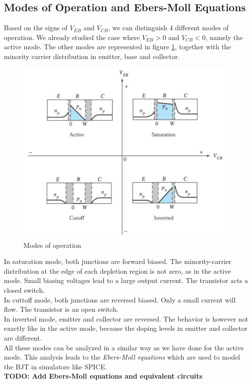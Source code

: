 \subsection{Modes of Operation and Ebers-Moll Equations}
\label{sec:modes_of_operation}
Based on the signs of $V_{EB}$ and $V_{CB}$, we can distinguish $4$ different modes of operation. We already studied the case where $V_{EB} > 0$ and $V_{CB} < 0$, namely the active mode. The other modes are represented in figure \ref{fig:bjt_modes}, together with the minority carrier distribution in emitter, base and collector.
\begin{figure}[h!]
\centering
\includegraphics[width=12cm]{figures/ch01/bjt_modes.jpg}
\caption{Modes of operation} 
\label{fig:bjt_modes}
\end{figure}
In saturation mode, both junctions are forward biased. The minority-carrier distribution at the edge of each depletion region is not zero, as in the active mode. Small biasing voltages lead to a large output current. The transistor acts a closed switch.\\
In cuttoff mode, both junctions are reversed biased. Only a small current will flow. The transistor is an open switch.\\
In inverted mode, emitter and collector are reversed. The behavior is however not exactly like in the active mode, because the doping levels in emitter and collector are different.\\
All these modes can be analyzed in a similar way as we have done for the active mode. This analysis leads to the \emph{Ebers-Moll equations} which are used to model the BJT in simulators like SPICE.\\
\textbf{TODO: Add Ebers-Moll equations and equivalent circuits}

